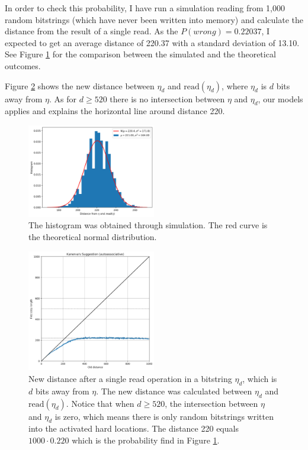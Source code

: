 In order to check this probability, I have run a simulation reading from 1,000 random bitstrings (which have never been written into memory) and calculate the distance from the result of a single read. As the $P(wrong) = 0.22037$, I expected to get an average distance of 220.37 with a standard deviation of 13.10. See Figure \ref{fig:sdm-read-random-bs} for the comparison between the simulated and the theoretical outcomes.

Figure \ref{fig:sdm-single-read-dist} shows the new distance between $\eta_d$ and $\text{read}(\eta_d)$, where $\eta_d$ is $d$ bits away from $\eta$. As for $d \ge 520$ there is no intersection between $\eta$ and $\eta_d$, our models applies and explains the horizontal line around distance 220.

\begin{figure}[!htb]
  \centering
  \includegraphics[width=0.5\textwidth]{./images02/autocorrelation/read-random-bs.png}

  \caption{The histogram was obtained through simulation. The red curve is the theoretical normal distribution.}
  \label{fig:sdm-read-random-bs}
\end{figure}

\begin{figure}[!htb]
  \centering
  \includegraphics[width=0.5\textwidth]{./images02/autocorrelation/single-read-dist.png}
  \caption{New distance after a single read operation in a bitstring $\eta_d$, which is $d$ bits away from $\eta$. The new distance was calculated between $\eta_d$ and $\text{read}(\eta_d)$. Notice that when $d \ge 520$, the intersection between $\eta$ and $\eta_d$ is zero, which means there is only random bitstrings written into the activated hard locations. The distance 220 equals $1000 \cdot 0.220$ which is the probability find in Figure \ref{fig:sdm-read-random-bs}.}
  \label{fig:sdm-single-read-dist}
\end{figure}
